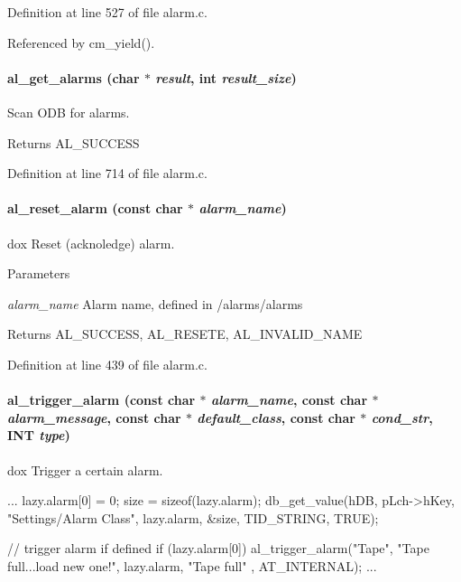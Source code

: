 Definition at line 527 of file alarm.c.

Referenced by cm\_\-yield().
\paragraph[{al\_\-get\_\-alarms}]{ al\_\-get\_\-alarms (char $\ast$ {\em result}, \/  int {\em result\_\-size})}\hfill\label{group__alfunctioncode_gabe1fa087b5c911dae39042bc768bf9c8}
Scan ODB for alarms. \begin{DoxyReturn}{Returns}
AL\_\-SUCCESS 
\end{DoxyReturn}


Definition at line 714 of file alarm.c.
\paragraph[{al\_\-reset\_\-alarm}]{ al\_\-reset\_\-alarm (const char $\ast$ {\em alarm\_\-name})}\hfill\label{group__alfunctioncode_gab555780bdb676810330f6a7cbbeaaf30}
dox Reset (acknoledge) alarm.


\begin{DoxyParams}{Parameters}
\item[{\em alarm\_\-name}]Alarm name, defined in /alarms/alarms \end{DoxyParams}
\begin{DoxyReturn}{Returns}
AL\_\-SUCCESS, AL\_\-RESETE, AL\_\-INVALID\_\-NAME 
\end{DoxyReturn}


Definition at line 439 of file alarm.c.
\paragraph[{al\_\-trigger\_\-alarm}]{ al\_\-trigger\_\-alarm (const char $\ast$ {\em alarm\_\-name}, \/  const char $\ast$ {\em alarm\_\-message}, \/  const char $\ast$ {\em default\_\-class}, \/  const char $\ast$ {\em cond\_\-str}, \/  {\bf INT} {\em type})}\hfill\label{group__alfunctioncode_gac024cd8160dc8b9418f05a63678f6c68}
dox Trigger a certain alarm. 
\begin{DoxyCode}
 ...
  lazy.alarm[0] = 0;
  size = sizeof(lazy.alarm);
  db_get_value(hDB, pLch->hKey, "Settings/Alarm Class", lazy.alarm, &size, 
      TID_STRING, TRUE);

  // trigger alarm if defined
  if (lazy.alarm[0])
    al_trigger_alarm("Tape", "Tape full...load new one!", lazy.alarm, "Tape full"
      , AT_INTERNAL);
  ...
\end{DoxyCode}
 
